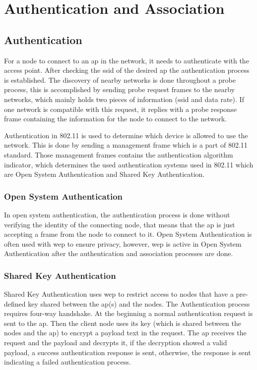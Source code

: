 \chapter{Authentication and Association}
\label{chap:auth_association_cycle}

\section{Authentication}
\label{sec:authentication}
For a node to connect to an \ac{ap} in the network, it needs to authenticate with the access
point. After checking the \ac{ssid} of the desired \ac{ap} the authentication process is established. The discovery
of nearby networks is done throughout a probe process, this is accomplished by sending probe request frames
to the nearby networks, which mainly holds two pieces of information (\ac{ssid} and data rate).\cite{roshan_leary_2004}
If one network is compatible with this request, it replies with a probe response frame containing the information for
the node to connect to the network.\cite{gast_2005}

\newParagraph
Authentication in 802.11 is used to determine which device is allowed to use the network. This is done by sending
a management frame which is a part of 802.11 standard. Those management frames contains the authentication algorithm
indicator, which determines the used authentication systems used in 802.11 which are Open System Authentication and
Shared Key Authentication.\cite{gast_2005}

\subsection{Open System Authentication}
\label{sub:open_system_auth}
In open system authentication, the authentication process is done without verifying the identity of the connecting node,
that means that the \ac{ap} is just accepting a frame from the node to connect to it. Open System Authentication is
often used with \ac{wep} to ensure privacy, however, \ac{wep} is active in Open System Authentication after the authentication
and association processes are done.\cite{cwsp-205_2016}

\subsection{Shared Key Authentication}
\label{sub:shared_key_auth}
Shared Key Authentication uses \ac{wep} to restrict access to nodes that have a pre-defined key shared between
the \ac{ap}(s) and the nodes. The Authentication process requires four-way handshake. At the beginning a normal
authentication request is sent to the \ac{ap}. Then the client node uses its key (which is shared between the nodes
and the \ac{ap}) to encrypt a payload text in the request. The \ac{ap} receives the request and the payload and
decrypts it, if the decryption showed a valid payload, a success authentication response is sent, otherwise, the
response is sent indicating a failed authentication process.\cite{cwsp-205_2016}


